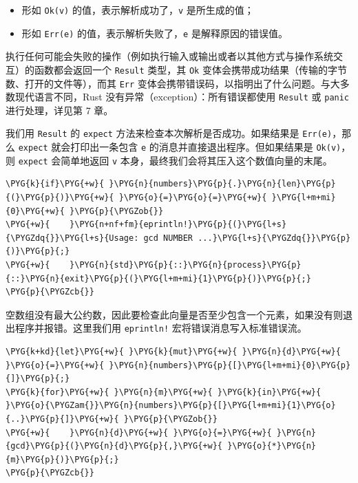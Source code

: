 \begin{itemize}
\item 形如 \texttt{Ok(v)} 的值，表示解析成功了，\texttt{v} 是所生成的值；
\item 形如 \texttt{Err(e)} 的值，表示解析失败了，\texttt{e} 是解释原因的错误值。
\end{itemize}

执行任何可能会失败的操作（例如执行输入或输出或者以其他方式与操作系统交互）的函数都会返回一个 \texttt{Result} 类型，其 \texttt{Ok} 变体会携带成功结果（传输的字节数、打开的文件等），而其 \texttt{Err} 变体会携带错误码，以指明出了什么问题。与大多数现代语言不同，Rust 没有异常（exception）：所有错误都使用 \texttt{Result} 或 \texttt{panic} 进行处理，详见第 7 章。

我们用 \texttt{Result} 的 \texttt{expect} 方法来检查本次解析是否成功。如果结果是 \texttt{Err(e)}，那么 \texttt{expect} 就会打印出一条包含 \texttt{e} 的消息并直接退出程序。但如果结果是 \texttt{Ok(v)}，则 \texttt{expect} 会简单地返回 \texttt{v} 本身，最终我们会将其压入这个数值向量的末尾。

\begin{Verbatim}[commandchars=\\\{\},breaklines=true,breakanywhere=true,fontsize=\codefont,xleftmargin=17bp]
\PYG{k}{if}\PYG{+w}{ }\PYG{n}{numbers}\PYG{p}{.}\PYG{n}{len}\PYG{p}{(}\PYG{p}{)}\PYG{+w}{ }\PYG{o}{=}\PYG{o}{=}\PYG{+w}{ }\PYG{l+m+mi}{0}\PYG{+w}{ }\PYG{p}{\PYGZob{}}
\PYG{+w}{    }\PYG{n+nf+fm}{eprintln!}\PYG{p}{(}\PYG{l+s}{\PYGZdq{}}\PYG{l+s}{Usage: gcd NUMBER ...}\PYG{l+s}{\PYGZdq{}}\PYG{p}{)}\PYG{p}{;}
\PYG{+w}{    }\PYG{n}{std}\PYG{p}{::}\PYG{n}{process}\PYG{p}{::}\PYG{n}{exit}\PYG{p}{(}\PYG{l+m+mi}{1}\PYG{p}{)}\PYG{p}{;}
\PYG{p}{\PYGZcb{}}
\end{Verbatim}

空数组没有最大公约数，因此要检查此向量是否至少包含一个元素，如果没有则退出程序并报错。这里我们用 \texttt{eprintln!} 宏将错误消息写入标准错误流。

\begin{Verbatim}[commandchars=\\\{\},breaklines=true,breakanywhere=true,fontsize=\codefont,xleftmargin=17bp]
\PYG{k+kd}{let}\PYG{+w}{ }\PYG{k}{mut}\PYG{+w}{ }\PYG{n}{d}\PYG{+w}{ }\PYG{o}{=}\PYG{+w}{ }\PYG{n}{numbers}\PYG{p}{[}\PYG{l+m+mi}{0}\PYG{p}{]}\PYG{p}{;}
\PYG{k}{for}\PYG{+w}{ }\PYG{n}{m}\PYG{+w}{ }\PYG{k}{in}\PYG{+w}{ }\PYG{o}{\PYGZam{}}\PYG{n}{numbers}\PYG{p}{[}\PYG{l+m+mi}{1}\PYG{o}{..}\PYG{p}{]}\PYG{+w}{ }\PYG{p}{\PYGZob{}}
\PYG{+w}{    }\PYG{n}{d}\PYG{+w}{ }\PYG{o}{=}\PYG{+w}{ }\PYG{n}{gcd}\PYG{p}{(}\PYG{n}{d}\PYG{p}{,}\PYG{+w}{ }\PYG{o}{*}\PYG{n}{m}\PYG{p}{)}\PYG{p}{;}
\PYG{p}{\PYGZcb{}}
\end{Verbatim}

